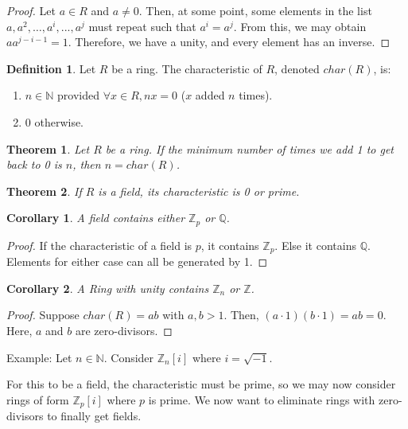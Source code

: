 \documentclass{article}
\theoremstyle{definition}
\newtheorem{definition}{Definition}
\theoremstyle{plain}
\newtheorem{theorem}{Theorem}
\theoremstyle{corollary}
\newtheorem{corollary}{Corollary}
\theoremstyle{lemma}
\begin{document}
\begin{proof}
    Let $a\in R$ and $a\neq0$. Then, at some point, some elements in the list $a,a^2,\dots,a^i,...,a^j$ must repeat such that $a^i=a^j$. From this, we may obtain $aa^{j-i-1}=1$. Therefore, we have a unity, and every element has an inverse.
\end{proof}

\begin{definition}
    Let $R$ be a ring. The characteristic of $R$, denoted $char(R)$, is:
    \begin{enumerate}
        \item $n\in\mathbb{N}$ provided $\forall x\in R,nx=0$ ($x$ added $n$ times).
        \item 0 otherwise.
    \end{enumerate}
\end{definition}

\begin{theorem}
    Let $R$ be a ring. If the minimum number of times we add 1 to get back to 0 is $n$, then $n=char(R)$.
\end{theorem}

\begin{theorem}
    If $R$ is a field, its characteristic is 0 or prime.
\end{theorem}

\begin{corollary}
    A field contains either $\mathbb{Z}_p$ or $\mathbb{Q}$.
\end{corollary}

\begin{proof}
    If the characteristic of a field is $p$, it contains $\mathbb Z_p$. Else it contains $\mathbb{Q}$. Elements for either case can all be generated by 1.
\end{proof}

\begin{corollary}
    A Ring with unity contains $\mathbb{Z}_n$ or $\mathbb{Z}$.
\end{corollary}

\begin{proof}
    Suppose $char(R)=ab$ with $a,b>1$. Then, $(a\cdot1)(b\cdot1)=ab=0$. Here, $a$ and $b$ are zero-divisors.
\end{proof}

Example: Let $n\in\mathbb N$. Consider $\mathbb{Z}_n[i]$ where $i=\sqrt{-1}$.

For this to be a field, the characteristic must be prime, so we may now consider rings of form $\mathbb{Z}_p[i]$ where $p$ is prime. We now want to eliminate rings with zero-divisors to finally get fields.
\end{document}
